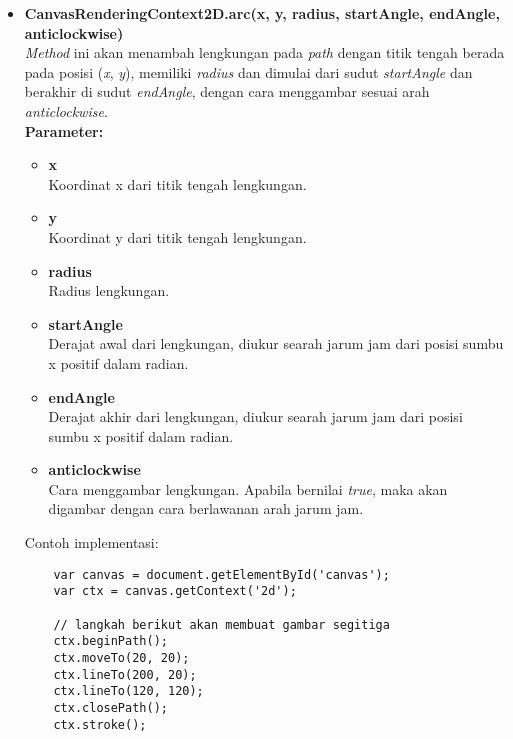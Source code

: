\begin{enumerate}
\begin{itemize}
		\item \textbf{CanvasRenderingContext2D.arc(x, y, radius, startAngle, endAngle, anticlockwise)} \\
		\textit{Method} ini akan menambah lengkungan pada \textit{path} dengan titik tengah berada pada posisi (\textit{x}, \textit{y}), memiliki \textit{radius} dan dimulai dari sudut \textit{startAngle} dan berakhir di sudut \textit{endAngle}, dengan cara menggambar sesuai arah \textit{anticlockwise}. \\
		\textbf{Parameter:}
		\begin{itemize}
			\item \textbf{x} \\ Koordinat x dari titik tengah lengkungan.
			\item \textbf{y} \\ Koordinat y dari titik tengah lengkungan.
			\item \textbf{radius} \\ Radius lengkungan.
			\item \textbf{startAngle} \\ Derajat awal dari lengkungan, diukur searah jarum jam dari posisi sumbu x positif dalam radian.
			\item \textbf{endAngle} \\ Derajat akhir dari lengkungan, diukur searah jarum jam dari posisi sumbu x positif dalam radian.
			\item \textbf{anticlockwise} \\ Cara menggambar lengkungan. Apabila bernilai \textit{true}, maka akan digambar dengan cara berlawanan arah jarum jam.
		\end{itemize}
		
		Contoh implementasi:
	\begin{lstlisting}
	var canvas = document.getElementById('canvas');
	var ctx = canvas.getContext('2d');
	
	// langkah berikut akan membuat gambar segitiga
	ctx.beginPath();
	ctx.moveTo(20, 20);
	ctx.lineTo(200, 20);
	ctx.lineTo(120, 120);
	ctx.closePath(); 
	ctx.stroke();
	\end{lstlisting}
		
	\end{itemize} 

\end{enumerate}
